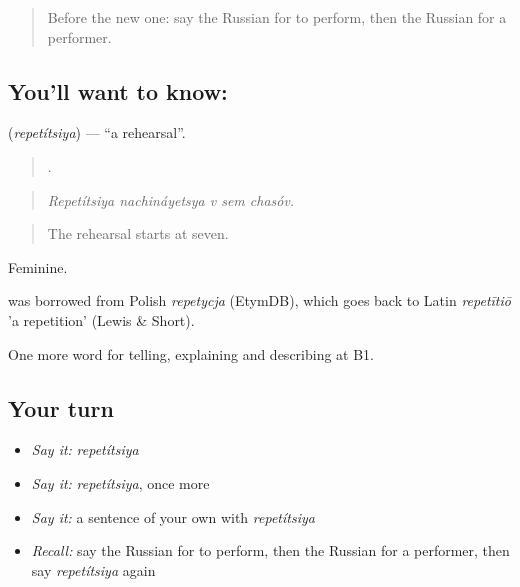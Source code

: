 \label{lesson:RU-C518-repetitsiya}



\begin{quote}
Before the new one: say the Russian for to perform, then the Russian for a performer.
\end{quote}

\subsection*{You'll want to know: }
\textbf{} (\emph{repetítsiya}) — \textquotedblleft{}a rehearsal\textquotedblright{}.

\begin{quote}
    .
\end{quote}

\begin{quote}
\emph{Repetítsiya nachináyetsya v sem chasóv.}
\end{quote}

\begin{quote}
The rehearsal starts at seven.
\end{quote}

Feminine.

\begin{cousinweb}
\emph{} was borrowed from Polish \emph{repetycja} (EtymDB), which goes back to Latin \emph{repetītiō} 'a repetition' (Lewis \& Short).
\end{cousinweb}

\begin{grammarlens}[title={What you've built}]
One more word for telling, explaining and describing at B1.
\end{grammarlens}

\subsection*{Your turn}
\begin{itemize}
\raggedright
  \item \emph{Say it:} \emph{repetítsiya}
  \item \emph{Say it:} \emph{repetítsiya}, once more
  \item \emph{Say it:} a sentence of your own with \emph{repetítsiya}
  \item \emph{Recall:} say the Russian for to perform, then the Russian for a performer, then say \emph{repetítsiya} again
\end{itemize}

